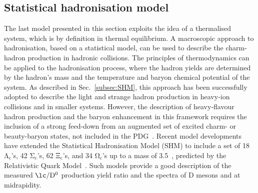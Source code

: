 \subsection{Statistical hadronisation model}
The last model presented in this section exploits the idea of a thermalised system, which is by definition in thermal equilibrium. A macroscopic approach to hadronisation, based on a statistical model, can be used to describe the charm-hadron production in hadronic collisions. The principles of thermodynamics can be applied to the hadronisation process, where the hadron yields are determined by the hadron's mass and the temperature and baryon chemical potential of the system. As described in Sec.~\ref{subsec:SHM}, this approach has been successfully adopted to describe the light and strange hadron production in heavy-ion collisions and in smaller systems. However, the description of heavy-flavour hadron production and the baryon enhancement in this framework requires the inclusion of a strong feed-down from an augmented set of excited charm- or beauty-baryon states, not included in the PDG~\cite{pdg}. Recent model developments~\cite{He:2019tik,He:2022tod} have extended the Statistical Hadronisation Model (SHM) to include a set of 18 $\mathrm{\Lambda_c}$'s, 42 $\mathrm{\Sigma_c}$'s, 62 $\mathrm{\Xi_c}$'s, and 34 $\mathrm{\Omega_c}$'s up to a mass of 3.5~\gev, predicted by the Relativistic Quark Model~\cite{Ebert:2011kk}. Such models provide a good description of the measured $\mathrm{\lc/D^0}$ production yield ratio and the \pt spectra of D mesons and \lc at midrapidity.

